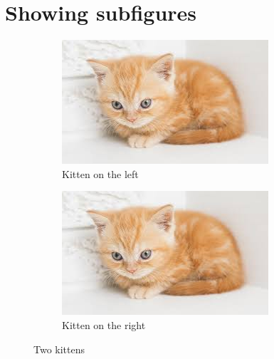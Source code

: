 \documentclass{article}%
\begin{document}
%
\normalsize%
\section{Showing subfigures}%
\label{sec:Showingsubfigures}%


\begin{figure}[h!]%
\begin{subfigure}[b]{0.45\linewidth}%
\includegraphics[width=\linewidth]{gatito.jpg}%
\caption{Kitten on the left}%
\end{subfigure}%
\begin{subfigure}[b]{0.45\linewidth}%
\includegraphics[width=\linewidth]{gatito.jpg}%
\caption{Kitten on the right}%
\end{subfigure}%
\caption{Two kittens}%
\end{figure}

%
\end{document}
